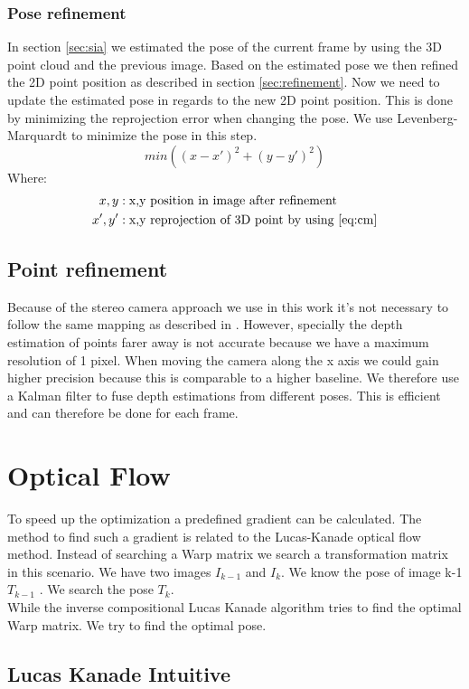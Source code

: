 \documentclass[11pt,a4paper,titlepage,oneside]{report}
\begin{document}
\subsection{Pose refinement}
In section \ref{sec:sia} we estimated the pose of the current frame by using the 3D point cloud and the previous image. Based on the estimated pose we then refined the 2D point position as described in section \ref{sec:refinement}. Now we need to update the estimated pose in regards to the new 2D point position. This is done by minimizing the reprojection error when changing the pose. We use Levenberg-Marquardt to minimize the pose in this step.
\begin{equation}\label{eq:pose_refinement}
	min((x - x')^2 + (y -y')^2)
\end{equation}
Where:
\begin{align*}
	x,y		&: \text{x,y position in image after refinement}\\
	x',y' &: \text{x,y reprojection of 3D point by using \ref{eq:cm}}
\end{align*}

\section{Point refinement}
Because of the stereo camera approach we use in this work it's not necessary to follow the same mapping as described in \cite{svo2}. However, specially the depth estimation of points farer away is not accurate because we have a maximum resolution of 1 pixel. When moving the camera along the x axis we could gain higher precision because this is comparable to a higher baseline. We therefore use a Kalman filter to fuse depth estimations from different poses. This is efficient and can therefore be done for each frame. 

\chapter{Optical Flow}
To speed up the optimization a predefined gradient can be calculated. The method to find such a gradient is related to the Lucas-Kanade optical flow method. Instead of searching a Warp matrix we search a transformation matrix in this scenario. We have two images $I_{k-1}$ and $I_{k}$. We know the pose of image k-1 $T_{k-1}$ . We search the pose $T_k$.\\
While the inverse compositional Lucas Kanade algorithm tries to find the optimal Warp matrix. We try to find the optimal pose.
\section{Lucas Kanade Intuitive}
\end{document}
